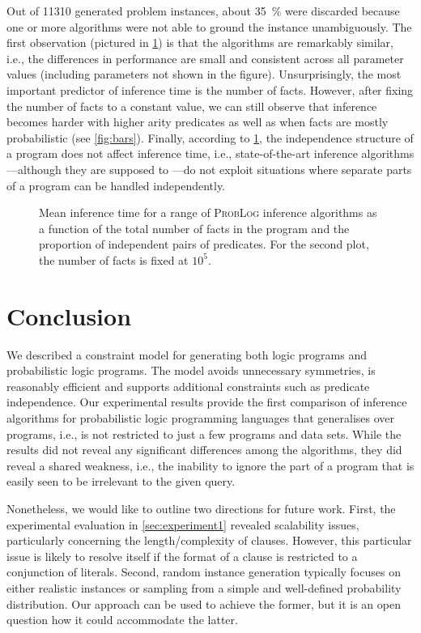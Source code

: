 \documentclass[runningheads]{llncs}
\begin{document}
Out of \num{11310} generated problem instances, about \SI{35}{\percent} were
discarded because one or more algorithms were not able to ground the instance
unambiguously. The first observation (pictured in \cref{fig:line_plots}) is that
the algorithms are remarkably similar, i.e., the differences in performance are
small and consistent across all parameter values (including parameters not shown
in the figure). Unsurprisingly, the most important predictor of inference time
is the number of facts. However, after fixing the number of facts to a constant
value, we can still observe that inference becomes harder with higher arity
predicates as well as when facts are mostly probabilistic (see \cref{fig:bars}).
Finally, according to \cref{fig:line_plots}, the independence structure of a
program does not affect inference time, i.e., state-of-the-art inference
algorithms---although they are supposed to
\cite{DBLP:conf/uai/FierensBTGR11}---do not exploit situations where separate
parts of a program can be handled independently.

\begin{figure}[t]
  \centering
  \caption{Mean inference time for a range of \textsc{ProbLog} inference
    algorithms as a function of the total number of facts in the program and the
    proportion of independent pairs of predicates. For the second plot, the
    number of facts is fixed at $10^5$.}
  \label{fig:line_plots}
\end{figure}

\section{Conclusion}

We described a constraint model for generating both logic programs and
probabilistic logic programs. The model avoids unnecessary symmetries, is
reasonably efficient and supports additional constraints such as predicate
independence. Our experimental results provide the first comparison of inference
algorithms for probabilistic logic programming languages that generalises over
programs, i.e., is not restricted to just a few programs and data sets. While
the results did not reveal any significant differences among the algorithms,
they did reveal a shared weakness, i.e., the inability to ignore the part of a
program that is easily seen to be irrelevant to the given query.

Nonetheless, we would like to outline two directions for future work. First, the
experimental evaluation in \cref{sec:experiment1} revealed scalability issues,
particularly concerning the length/complexity of clauses. However, this
particular issue is likely to resolve itself if the format of a clause is
restricted to a conjunction of literals. Second, random instance generation
typically focuses on either realistic instances or sampling from a simple and
well-defined probability distribution. Our approach can be used to achieve the
former, but it is an open question how it could accommodate the latter.
\end{document}
